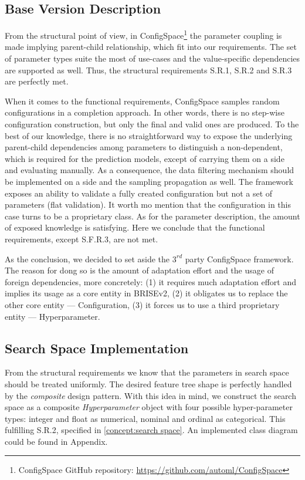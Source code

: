 \subsection{Base Version Description}
From the structural point of view, in ConfigSpace\footnote{ConfigSpace GitHub repository: \url{https://github.com/automl/ConfigSpace}} the parameter coupling is made implying parent-child relationship, which fit into our requirements. The set of parameter types suite the most of use-cases and the value-specific dependencies are supported as well. Thus, the structural requirements S.R.1, S.R.2 and S.R.3 are perfectly met.

When it comes to the functional requirements, ConfigSpace samples random configurations in a completion approach. In other words, there is no step-wise configuration construction, but only the final and valid ones are produced. To the best of our knowledge, there is no straightforward way to expose the underlying parent-child dependencies among parameters to distinguish a non-dependent, which is required for the prediction models, except of carrying them on a side and evaluating manually. As a consequence, the data filtering mechanism should be implemented on a side and the sampling propagation as well. The framework exposes an ability to validate a fully created configuration but not a set of parameters (flat validation). It worth mo mention that the configuration in this case turns to be a proprietary class. As for the parameter description, the amount of exposed knowledge is satisfying. Here we conclude that the functional requirements, except S.F.R.3, are not met.

As the conclusion, we decided to set aside the $3^{rd}$ party ConfigSpace framework. The reason for dong so is the amount of adaptation effort and the usage of foreign dependencies, more concretely: (1) it requires much adaptation effort and implies its usage as a core entity in BRISEv2, (2) it obligates us to replace the other core entity — Configuration, (3) it forces us to use a third proprietary entity — Hyperparameter. 

\subsection{Search Space Implementation}\label{impl: search space impl}
From the structural requirements we know that the parameters in search space should be treated uniformly. The desired feature tree shape is perfectly handled by the \emph{composite} design pattern. With this idea in mind, we construct the search space as a composite \emph{Hyperparameter} object with four possible hyper-parameter types: integer and float as numerical, nominal and ordinal as categorical. This fulfilling S.R.2, specified in \cref{concept:search space}. An implemented class diagram could be found in Appendix.

